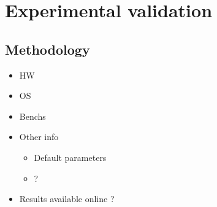 \section{Experimental validation}
\label{sec:expe}

\subsection{Methodology}
\label{sec:exp-methodo}

\begin{itemize}
    \item HW
    \item OS
    \item Benchs
    \item Other info
        \begin{itemize}
            \item Default parameters
            \item  ?
        \end{itemize}
    \item Results available online ?
\end{itemize}

